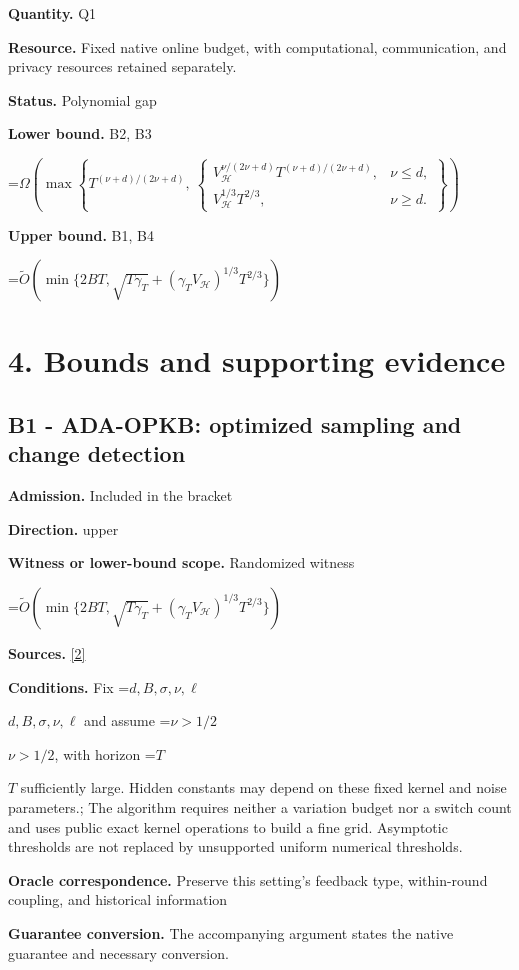 \documentclass[10pt,a4paper]{article}
\newcommand{\AtlasMath}[1]{\par\begingroup\centering\setbox0=\hbox{$\displaystyle #1$}\ifdim\wd0>1.4\linewidth\typeout{ATLAS WIDE FORMULA: \the\wd0}\fi\ifdim\wd0>\linewidth\resizebox{\linewidth}{!}{\box0}\else\box0\fi\par\endgroup}
\newcommand{\AtlasInlineMath}[1]{\begingroup\setbox0=\hbox{$#1$}\ifdim\wd0>.4\linewidth\endgroup\AtlasMath{#1}\else\endgroup$#1$\fi}
\begin{document}
\textbf{Quantity.} Q1

\textbf{Resource.} Fixed native online budget, with computational, communication, and privacy resources retained separately.

\textbf{Status.} Polynomial gap

\textbf{Lower bound.} B2, B3

\AtlasMath{\Omega(\max\left\{T^{(\nu+d)/(2\nu+d)},\ \begin{cases}V_{\mathcal{H}}^{\nu/(2\nu+d)}T^{(\nu+d)/(2\nu+d)},&\nu\le d,\\ V_{\mathcal{H}}^{1/3}T^{2/3},&\nu\ge d.\end{cases}\right\})}
\textbf{Upper bound.} B1, B4

\AtlasMath{\widetilde{O}\!\left(\min\{2BT,\sqrt{T\gamma_T}+(\gamma_T V_{\mathcal{H}})^{1/3}T^{2/3}\}\right)}
\section{4. Bounds and supporting evidence}
\subsection{B1 - ADA-OPKB: optimized sampling and change detection}
\textbf{Admission.} Included in the bracket

\textbf{Direction.} upper

\textbf{Witness or lower-bound scope.} Randomized witness

\AtlasMath{\widetilde{O}\!\left(\min\{2BT,\sqrt{T\gamma_T}+(\gamma_T V_{\mathcal{H}})^{1/3}T^{2/3}\}\right)}
\textbf{Sources.} \href{https://proceedings.mlr.press/v206/hong23b.html}{[2]}

\textbf{Conditions.} Fix \AtlasInlineMath{d,B,\sigma,\nu,\ell} and assume \AtlasInlineMath{\nu>1/2}, with horizon \AtlasInlineMath{T} sufficiently large. Hidden constants may depend on these fixed kernel and noise parameters.; The algorithm requires neither a variation budget nor a switch count and uses public exact kernel operations to build a fine grid. Asymptotic thresholds are not replaced by unsupported uniform numerical thresholds.

\textbf{Oracle correspondence.} Preserve this setting's feedback type, within-round coupling, and historical information

\textbf{Guarantee conversion.} The accompanying argument states the native guarantee and necessary conversion.
\end{document}
